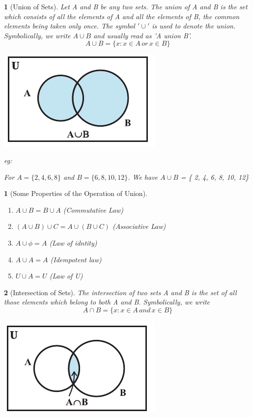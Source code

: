 \documentclass[12pt]{article}
\theoremstyle{colored}
\newtheorem*{defn}{}
\theoremstyle{subcolored}
\newtheorem*{subdefn}{}
\begin{document}
\begin{multicols}{2}
\begin{defn}[\large Union of Sets]
    \hfil \break
    Let A and B be any two sets. The union of A and B is the set
    which consists of all the elements of A and all the elements of B, the common elements
    being taken only once. The symbol $'\cup'$ is used to denote the union. Symbolically, we
    write $A \cup B$ and usually read as 'A union B'.
    $$A \cup B = \{ x : x \in A\, or\, x \in B \}$$
    \begin{center}
        \includegraphics[scale=0.4]{set4.png}
    \end{center}

    eg:

    For  $A = \{ 2, 4, 6, 8\}$ and $B = \{ 6, 8, 10, 12\}$.
    We have $A \cup B$ = \{ 2, 4, 6, 8, 10, 12\}
\end{defn}

\begin{subdefn}[Some Properties of the Operation of Union]
    \hfill \break
    \begin{enumerate}
        \item[(i)] $A \cup B = B \cup A$  (Commutative Law)
        \item[(ii)] $(A \cup B)\cup C = A \cup (B \cup C)$ (Associative Law) 
        \item[(iii)] $A \cup \phi =A$ (Law of idntity)
        \item[(iv)] $A \cup A =A$ (Idempotent law) 
        \item[(v)] $U \cup A = U$ (Law of U)
    \end{enumerate}

\end{subdefn}

\begin{defn}[\large Intersection of Sets]
    \hfill \break
    The intersection of two sets A and B
is the set of all those elements which belong to both
A and B. Symbolically, we write
$$ A \cap B =\{x: x \in A\, and \, x \in B \}$$

\begin{center}
    \includegraphics[scale=0.4]{set3.png}
\end{center}
    

\end{defn}
\end{multicols}
\end{document}
